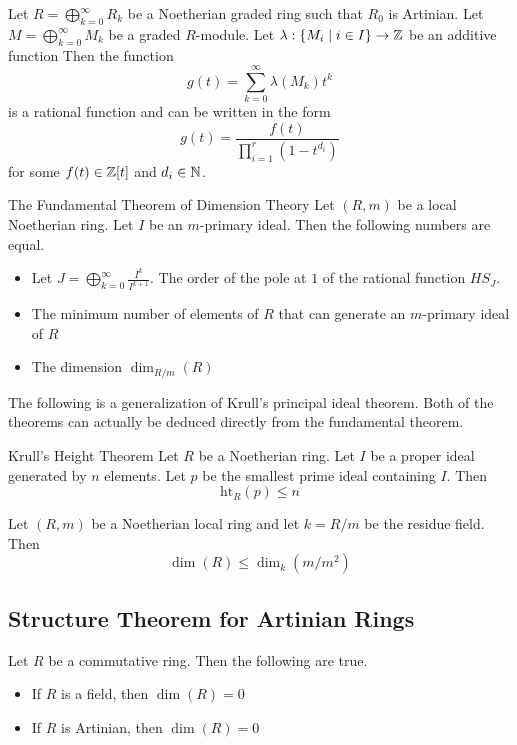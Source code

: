 \documentclass[a4paper]{article}
\begin{document}
\begin{thm}{}{} Let $R=\bigoplus_{k=0}^\infty R_k$ be a Noetherian graded ring such that $R_0$ is Artinian. Let $M=\bigoplus_{k=0}^\infty M_k$ be a graded $R$-module. Let $\lambda:\{M_i\;|\;i\in I\}\to\mathbb{Z}$ be an additive function Then the function $$g(t)=\sum_{k=0}^\infty\lambda(M_k)t^k$$ is a rational function and can be written in the form $$g(t)=\frac{f(t)}{\prod_{i=1}^r(1-t^{d_i})}$$ for some $f(t)\in\mathbb{Z}[t]$ and $d_i\in\mathbb{N}$. 
\end{thm}

\begin{thm}{The Fundamental Theorem of Dimension Theory}{} Let $(R,m)$ be a local Noetherian ring. Let $I$ be an $m$-primary ideal. Then the following numbers are equal. 
\begin{itemize}
\item Let $J=\bigoplus_{k=0}^\infty\frac{I^k}{I^{k+1}}$. The order of the pole at $1$ of the rational function $HS_J$. 
\item The minimum number of elements of $R$ that can generate an $m$-primary ideal of $R$
\item The dimension $\dim_{R/m}(R)$
\end{itemize}
\end{thm}

The following is a generalization of Krull's principal ideal theorem. Both of the theorems can actually be deduced directly from the fundamental theorem. 

\begin{thm}{Krull's Height Theorem}{} Let $R$ be a Noetherian ring. Let $I$ be a proper ideal generated by $n$ elements. Let $p$ be the smallest prime ideal containing $I$. Then $$\text{ht}_R(p)\leq n$$
\end{thm}

\begin{thm}{}{} Let $(R,m)$ be a Noetherian local ring and let $k=R/m$ be the residue field. Then $$\dim(R)\leq\dim_k(m/m^2)$$
\end{thm}

\subsection{Structure Theorem for Artinian Rings}
\begin{lmm}{}{} Let $R$ be a commutative ring. Then the following are true. 
\begin{itemize}
\item If $R$ is a field, then $\dim(R)=0$
\item If $R$ is Artinian, then $\dim(R)=0$
\end{itemize}
\end{lmm}
\end{document}
